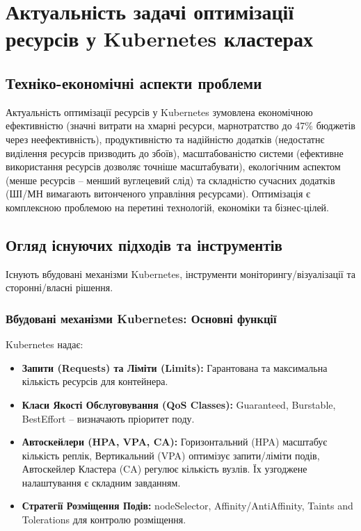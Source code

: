 \chapter{Актуальність задачі оптимізації ресурсів у Kubernetes кластерах}

\section{Техніко-економічні аспекти проблеми}

Актуальність оптимізації ресурсів у Kubernetes зумовлена економічною ефективністю (значні витрати на хмарні ресурси, марнотратство до 47\% бюджетів через неефективність), продуктивністю та надійністю додатків (недостатнє виділення ресурсів призводить до збоїв), масштабованістю системи (ефективне використання ресурсів дозволяє точніше масштабувати), екологічним аспектом (менше ресурсів – менший вуглецевий слід) та складністю сучасних додатків (ШІ/МН вимагають витонченого управління ресурсами). Оптимізація є комплексною проблемою на перетині технологій, економіки та бізнес-цілей.

\section{Огляд існуючих підходів та інструментів}

Існують вбудовані механізми Kubernetes, інструменти моніторингу/візуалізації та сторонні/власні рішення.

\subsection{Вбудовані механізми Kubernetes: Основні функції}
Kubernetes надає:
\begin{itemize}
    \item \textbf{Запити (Requests) та Ліміти (Limits):} Гарантована та максимальна кількість ресурсів для контейнера.
    \item \textbf{Класи Якості Обслуговування (QoS Classes):} Guaranteed, Burstable, BestEffort – визначають пріоритет поду.
    \item \textbf{Автоскейлери (HPA, VPA, CA):} Горизонтальний (HPA) масштабує кількість реплік, Вертикальний (VPA) оптимізує запити/ліміти подів, Автоскейлер Кластера (CA) регулює кількість вузлів. Їх узгоджене налаштування є складним завданням.
    \item \textbf{Стратегії Розміщення Подів:} nodeSelector, Affinity/AntiAffinity, Taints and Tolerations для контролю розміщення.
\end{itemize}


